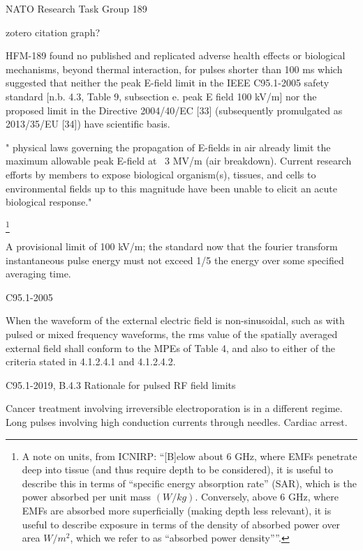 \documentclass[paper.tex]{subfiles}
\begin{document}
NATO Research Task Group 189 \cite{treatyelectromagnetic}

zotero citation graph?

HFM-189 found no published and replicated adverse health effects or biological mechanisms, beyond
thermal interaction, for pulses shorter than 100 ms which suggested that neither the peak E-field limit in the
IEEE C95.1-2005 safety standard [n.b. 4.3, Table 9, subsection e. peak E field 100 kV/m] nor the proposed limit in the Directive 2004/40/EC [33] (subsequently promulgated as 2013/35/EU [34]) have scientific basis. 



" physical laws governing the propagation of E-fields in air already limit the maximum allowable peak E-field at ~3 MV/m (air breakdown). Current research efforts by members to expose biological organism(s), tissues, and cells to environmental
fields up to this magnitude have been unable to elicit an acute biological response."


\footnote{A note on units, from ICNIRP: ``{[B]elow about 6 GHz, where EMFs penetrate deep into tissue (and thus require depth to be considered), it is useful to describe this in terms of “specific energy absorption rate” (SAR), which is the power absorbed per unit mass $(W/kg)$. Conversely, above 6 GHz, where EMFs are absorbed more superficially (making depth less relevant), it is useful to describe exposure in terms of the density of absorbed power over area $W/m^2$, which we refer to as “absorbed power density”}''. }

A provisional limit of 100 kV/m; the standard now that the fourier transform instantaneous pulse energy must not exceed 1/5 the energy over some specified averaging time.

C95.1-2005


When the waveform of the external electric field is non-sinusoidal, such as with pulsed or mixed frequency
waveforms, the rms value of the spatially averaged external field shall conform to the MPEs of Table 4, and
also to either of the criteria stated in 4.1.2.4.1 and 4.1.2.4.2.




C95.1-2019, B.4.3 Rationale for pulsed RF field limits










Cancer treatment involving irreversible electroporation is in a different regime. Long pulses involving high conduction currents through needles. Cardiac arrest.
\end{document}
